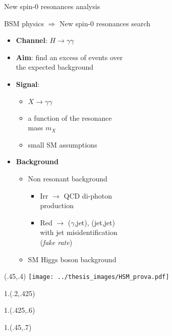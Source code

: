 \documentclass[10pt,UKenglish, leqno, xcolor = dvipsnames]{beamer}
\begin{document}
	\begin{frame}{New spin-0 resonances analysis}
		\vfill
		\begin{center}
			BSM physics $\Rightarrow$ New spin-0 resonances search
		\end{center}
		\begin{itemize}
			\item \textbf{Channel}: $H \to \gamma\gamma$
			\item \textbf{Aim}: find an excess of events over\\ the expected background
			\item \textbf{Signal}:
			\begin{itemize}
				\item $X \to \gamma\gamma$ 
				\item a function of the resonance\\ mass $m_X$
				\item small SM assumptions
			\end{itemize}
			\item \textbf{Background}
			\begin{itemize}
				\item Non resonant background
				\begin{itemize}
					\item Irr $\to$ QCD di-photon\\ production
					\item Red $\to$ ($\gamma$,jet), (jet,jet)\\ with jet misidentification\\ (\textit{fake rate})
				\end{itemize}
				\item SM Higgs boson background
			\end{itemize}
		\end{itemize}
		\vfill 
		\begin{textblock}{1}(.45,.4)
			\texttt{[image: ../thesis\_images/HSM\_prova.pdf]}
		\end{textblock}
		\begin{textblock}{1.}(.2,.425)
		\end{textblock}
		\begin{textblock}{1.}(.425,.6)
		\end{textblock}
		\begin{textblock}{1.}(.45,.7)
		\end{textblock}
	\end{frame}
\end{document}
